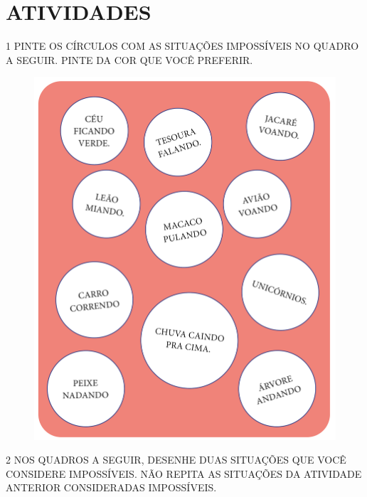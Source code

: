 
\section{ATIVIDADES}

\num{1} PINTE OS CÍRCULOS COM AS SITUAÇÕES IMPOSSÍVEIS NO QUADRO A SEGUIR. PINTE
DA COR QUE VOCÊ PREFERIR.


\begin{figure}[htpb!]
\centering
\includegraphics[width=.8\textwidth]{./media/SAEB_1ANO_MAT_FIGURA84.png}
\end{figure}


\pagebreak
\num{2} NOS QUADROS A SEGUIR, DESENHE DUAS SITUAÇÕES QUE VOCÊ CONSIDERE
IMPOSSÍVEIS. NÃO REPITA AS SITUAÇÕES DA ATIVIDADE ANTERIOR CONSIDERADAS IMPOSSÍVEIS.

